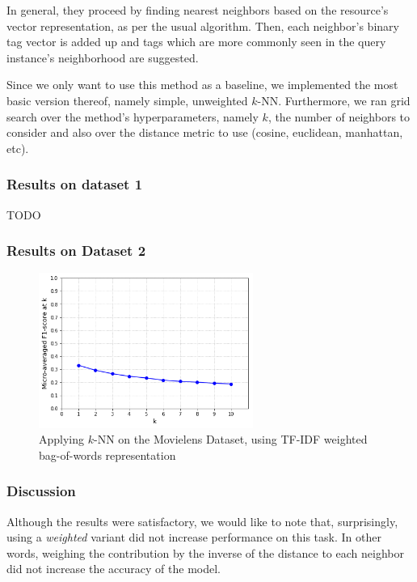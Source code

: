 In general, they proceed by finding nearest neighbors based on the resource's vector representation, as per the usual algorithm. Then, each neighbor's binary tag vector is added up and tags which are more commonly seen in the query instance's neighborhood are suggested.

Since we only want to use this method as a baseline, we implemented the most basic version thereof, namely simple, unweighted $k$-NN. Furthermore, we ran grid search over the method's hyperparameters, namely $k$, the number of neighbors to consider and also over the distance metric to use (cosine, euclidean, manhattan, etc).

\subsubsection{Results on dataset 1}

{\color{red} TODO}

\subsubsection{Results on Dataset 2}

\begin{figure}[H]
    \centering
    \includegraphics[width=7cm]{chapters/05_experiments/images/knn-tfidf-movielens.png}
    \caption{Applying $k$-NN on the Movielens Dataset, using TF-IDF weighted bag-of-words representation}
    \label{fig:knn__movielens}
\end{figure}

\subsubsection{Discussion}

Although the results were satisfactory, we would like to note that, surprisingly, using a \textit{weighted} variant did not increase performance on this task. In other words, weighing the contribution by the inverse of the distance to each neighbor did not increase the accuracy of the model.

